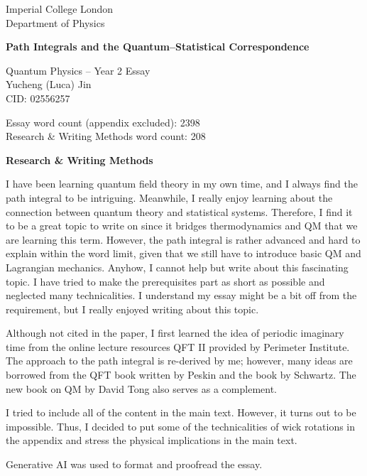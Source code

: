 \documentclass[12pt,a4paper]{article}
\newcommand{\EssayTitle}{Path Integrals and the Quantum–Statistical Correspondence}
\newcommand{\EssayWordCount}{2398}
\newcommand{\MethodsWordCount}{208}
\begin{document}
\begin{titlepage}
\begin{center}
{\Large Imperial College London \\ Department of Physics \\[2em]}
{\huge \textbf{\EssayTitle} \par}
\vspace{1em}

{\large Quantum Physics – Year 2 Essay \\[1.5em]}
{\large Yucheng (Luca) Jin \\ CID: 02556257 \\[2em]}

\vfill

{\large Essay word count (appendix excluded): \EssayWordCount \\ 
Research \& Writing Methods word count: \MethodsWordCount \\[2em]}

\noindent\textbf{Research \& Writing Methods}\\[0.5em]
\end{center}


I have been learning quantum field theory in my own time, and I always find the path integral to be intriguing. Meanwhile, I really enjoy learning about the connection between quantum theory and statistical systems. Therefore, I find it to be a great topic to write on since it bridges thermodynamics and QM that we are learning this term. However, the path integral is rather advanced and hard to explain within the word limit, given that we still have to introduce basic QM and Lagrangian mechanics. Anyhow, I cannot help but write about this fascinating topic. I have tried to make the prerequisites part as short as possible and neglected many technicalities. I understand my essay might be a bit off from the requirement, but I really enjoyed writing about this topic.

Although not cited in the paper, I first learned the idea of periodic imaginary time from the online lecture resources QFT II provided by Perimeter Institute. The approach to the path integral is re-derived by me; however, many ideas are borrowed from the QFT book written by Peskin and the book by Schwartz. The new book on QM by David Tong also serves as a complement. 

I tried to include all of the content in the main text. However, it turns out to be impossible. Thus, I decided to put some of the technicalities of wick rotations in the appendix and stress the physical implications in the main text.

Generative AI was used to format and proofread the essay.

\end{titlepage}
\setcounter{page}{1}
\end{document}
